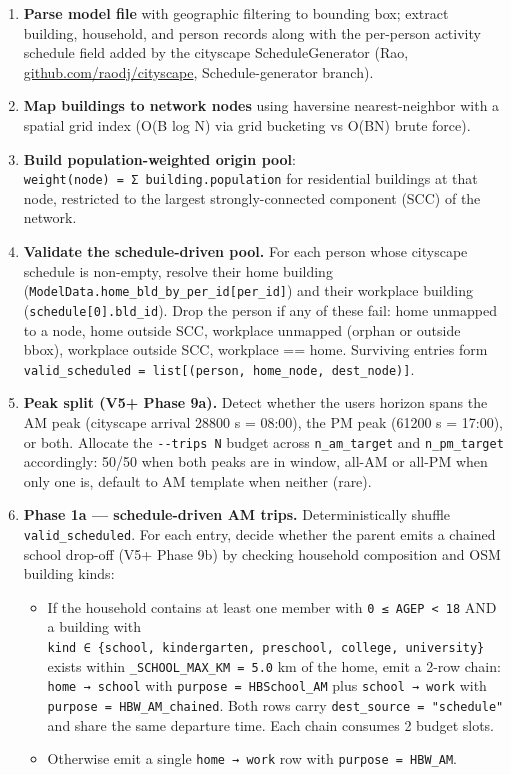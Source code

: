\begin{enumerate}
\def\labelenumi{\arabic{enumi}.}
\item
  \textbf{Parse model file} with geographic filtering to bounding box;
  extract building, household, and person records along with the
  per-person activity schedule field added by the cityscape
  ScheduleGenerator (Rao,
  \href{https://github.com/raodj/cityscape}{github.com/raodj/cityscape},
  Schedule-generator branch).
\item
  \textbf{Map buildings to network nodes} using haversine
  nearest-neighbor with a spatial grid index (O(B log N) via grid
  bucketing vs O(BN) brute force).
\item
  \textbf{Build population-weighted origin pool}:
  \texttt{weight(node)\ =\ Σ\ building.population} for residential
  buildings at that node, restricted to the largest strongly-connected
  component (SCC) of the network.
\item
  \textbf{Validate the schedule-driven pool.} For each person whose
  cityscape schedule is non-empty, resolve their home building
  (\texttt{ModelData.home\_bld\_by\_per\_id{[}per\_id{]}}) and their
  workplace building (\texttt{schedule{[}0{]}.bld\_id}). Drop the person
  if any of these fail: home unmapped to a node, home outside SCC,
  workplace unmapped (orphan or outside bbox), workplace outside SCC,
  workplace == home. Surviving entries form
  \texttt{valid\_scheduled\ =\ list{[}(person,\ home\_node,\ dest\_node){]}}.
\item
  \textbf{Peak split (V5+ Phase 9a).} Detect whether the
  user\textquotesingle s horizon spans the AM peak (cityscape arrival
  28800 s = 08:00), the PM peak (61200 s = 17:00), or both. Allocate the
  \texttt{-\/-trips\ N} budget across \texttt{n\_am\_target} and
  \texttt{n\_pm\_target} accordingly: 50/50 when both peaks are in
  window, all-AM or all-PM when only one is, default to AM template when
  neither (rare).
\item
  \textbf{Phase 1a --- schedule-driven AM trips.} Deterministically
  shuffle \texttt{valid\_scheduled}. For each entry, decide whether the
  parent emits a chained school drop-off (V5+ Phase 9b) by checking
  household composition and OSM building kinds:

  \begin{itemize}
  \tightlist
  \item
    If the household contains at least one member with
    \texttt{0\ ≤\ AGEP\ \textless{}\ 18} AND a building with
    \texttt{kind\ ∈\ \{school,\ kindergarten,\ preschool,\ college,\ university\}}
    exists within \texttt{\_SCHOOL\_MAX\_KM\ =\ 5.0} km of the home,
    emit a 2-row chain: \texttt{home\ →\ school} with
    \texttt{purpose\ =\ HBSchool\_AM} plus \texttt{school\ →\ work} with
    \texttt{purpose\ =\ HBW\_AM\_chained}. Both rows carry
    \texttt{dest\_source\ =\ "schedule"} and share the same departure
    time. Each chain consumes 2 budget slots.
  \item
    Otherwise emit a single \texttt{home\ →\ work} row with
    \texttt{purpose\ =\ HBW\_AM}.
  \end{itemize}


\end{enumerate}
